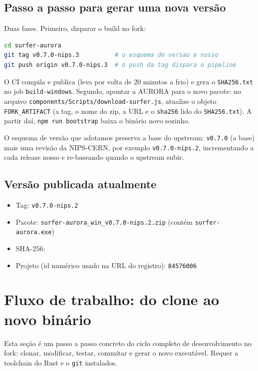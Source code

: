 \documentclass[11pt,a4paper]{article}
\begin{document}
\subsection{Passo a passo para gerar uma nova versão}

Duas fases. Primeiro, disparar o build no fork:

\begin{lstlisting}[language=bash]
cd surfer-aurora
git tag v0.7.0-nips.3          # o esquema de versao e nosso
git push origin v0.7.0-nips.3  # o push da tag dispara o pipeline
\end{lstlisting}

O CI compila e publica (leva por volta de 20 minutos a frio) e gera o
\texttt{SHA256.txt} no job \texttt{build-windows}. Segundo, apontar a AURORA para
o novo pacote: no arquivo \texttt{components/Scripts/download-surfer.js}, atualize
o objeto \texttt{FORK\_ARTIFACT} (a tag, o nome do zip, a URL e o \texttt{sha256}
lido do \texttt{SHA256.txt}). A partir daí, \texttt{npm run bootstrap} baixa o
binário novo sozinho.

O esquema de versão que adotamos preserva a base do upstream: \texttt{v0.7.0}
(a base) mais uma revisão da NIPS-CERN, por exemplo \texttt{v0.7.0-nips.2},
incrementando a cada release nosso e re-baseando quando o upstream subir.

\subsection{Versão publicada atualmente}

\begin{itemize}
  \item Tag: \texttt{v0.7.0-nips.2}
  \item Pacote: \texttt{surfer-aurora\_win\_v0.7.0-nips.2.zip} (contém
        \texttt{surfer-aurora.exe})
  \item SHA-256:
        \texttt{}
  \item Projeto (id numérico usado na URL do registro): \texttt{84576006}
\end{itemize}

\section{Fluxo de trabalho: do clone ao novo binário}

Esta seção é um passo a passo concreto do ciclo completo de desenvolvimento no
fork: clonar, modificar, testar, commitar e gerar o novo executável. Requer a
toolchain do Rust e o \texttt{git} instalados.
\end{document}
